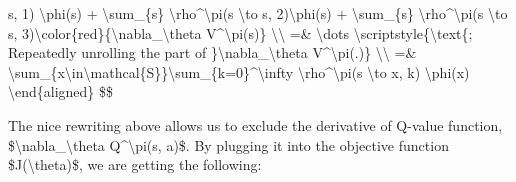 s\textquotesingle, 1) \textbackslash phi(s\textquotesingle) + \textbackslash sum\_\{s\textquotesingle\textquotesingle\} \textbackslash rho\^{}\textbackslash pi(s \textbackslash to s\textquotesingle\textquotesingle, 2)\textbackslash phi(s\textquotesingle\textquotesingle) + \textbackslash sum\_\{s\textquotesingle\textquotesingle\textquotesingle\} \textbackslash rho\^{}\textbackslash pi(s \textbackslash to s\textquotesingle\textquotesingle\textquotesingle, 3)\textbackslash color\{red\}\{\textbackslash nabla\_\textbackslash theta V\^{}\textbackslash pi(s\textquotesingle\textquotesingle\textquotesingle)\} \textbackslash\textbackslash{} =\& \textbackslash dots \textbackslash scriptstyle\{\textbackslash text\{; Repeatedly unrolling the part of \}\textbackslash nabla\_\textbackslash theta V\^{}\textbackslash pi(.)\} \textbackslash\textbackslash{} =\& \textbackslash sum\_\{x\textbackslash in\textbackslash mathcal\{S\}\}\textbackslash sum\_\{k=0\}\^{}\textbackslash infty \textbackslash rho\^{}\textbackslash pi(s \textbackslash to x, k) \textbackslash phi(x) \textbackslash end\{aligned\} \$\$

The nice rewriting above allows us to exclude the derivative of Q-value function, \$\textbackslash nabla\_\textbackslash theta Q\^{}\textbackslash pi(s, a)\$. By plugging it into the objective function \$J(\textbackslash theta)\$, we are getting the following:

